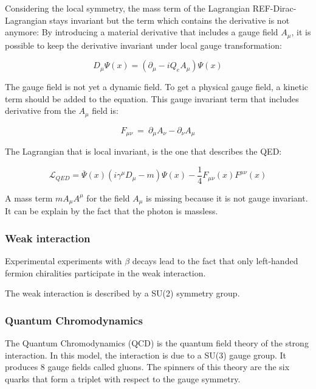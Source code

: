       Considering the local symmetry, the mass term of the Lagrangian REF-Dirac-Lagrangian stays invariant but the term which contains the derivative is not anymore:
      By introducing a material derivative that includes a gauge field $A_{\mu}$, it is possible to keep the derivative invariant under local gauge transformation:

      \begin{equation}
        D_{\mu} \Psi\left(x\right) =  \left(\partial_{\mu} - i Q_e A_{\mu}\right) \Psi\left(x\right)
      \end{equation}

     The gauge field is not yet a dynamic field. To get a physical gauge field, a kinetic term should be added to the equation.
     This gauge invariant term that includes derivative from the $A_{\mu}$ field is:
    
     \begin{equation}
       F_{\mu \nu} \ = \ \partial_\mu A_\nu - \partial_\nu A_\mu
     \end{equation}

     The Lagrangian that is local invariant, is the one that describes the QED:

    \begin{equation}
    	\mathcal{L}_{QED} =  \overline{\Psi}\left(x\right)\left( i \gamma^\mu D_\mu - m \right) \Psi\left(x\right) - \frac{1}{4}F_{\mu \nu}\left(x\right) F^{\mu \nu}\left(x\right)
    \end{equation}

    A mass term $m A_{\mu} A^{\mu}$ for the field $A_{\mu}$ is missing because it is not gauge invariant. It can be explain by the fact that the photon is massless.

    \subsubsection{Weak interaction}

    Experimental experiments with $\beta$ decays lead to the fact that only left-handed fermion chiralities participate in the weak interaction.

    The weak interaction is described by a SU(2) symmetry group. 
    
    \subsubsection{Quantum Chromodynamics}
    
    The Quantum Chromodynamics (QCD) is the quantum field theory of the strong interaction.
    In this model, the interaction is due to a SU(3) gauge group. 
    It produces 8 gauge fields called gluons.
    The spinners of this theory are the six quarks that form a triplet with respect to the gauge symmetry.

